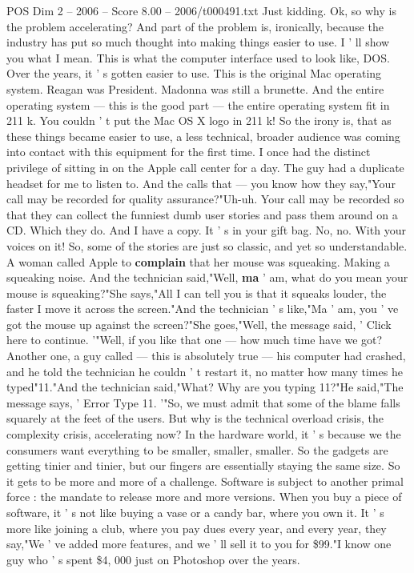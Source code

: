\begin{textsample}{POS Dim 2 – 2006 – Score 8.00 – 2006/t000491.txt}
Just kidding.
Ok, so why is the problem accelerating?
And part of the problem is, ironically, because the industry has put so much thought into making things easier to use.
I ' ll show you what I mean.
This is what the computer interface used to look like, DOS.
Over the years, it ' s gotten easier to use.
This is the original Mac operating system.
Reagan was President.
Madonna was still a brunette.
And the entire operating system — this is the good part — the entire operating system fit in 211 k.
You couldn ' t put the Mac OS X logo in 211 k!
So the irony is, that as these things became easier to use, a less technical, broader audience was coming into contact with this equipment for the first time.
I once had the distinct privilege of sitting in on the Apple call center for a day.
The guy had a duplicate headset for me to listen to.
And the calls that — you know how they say,"Your call may be recorded for quality assurance?"Uh-uh.
Your call may be recorded so that they can collect the funniest dumb user stories and pass them around on a CD.
Which they do.
And I have a copy.
It ' s in your gift bag.
No, no.
With your voices on it!
So, some of the stories are just so classic, and yet so understandable.
A woman called Apple to \textbf{complain} that her mouse was squeaking.
Making a squeaking noise.
And the technician said,"Well, \textbf{ma} ' am, what do you mean your mouse is squeaking?"She says,"All I can tell you is that it squeaks louder, the faster I move it across the screen."And the technician ' s like,"Ma ' am, you ' ve got the mouse up against the screen?"She goes,"Well, the message said, ' Click here to continue. '"Well, if you like that one — how much time have we got?
Another one, a guy called — this is absolutely true — his computer had crashed, and he told the technician he couldn ' t restart it, no matter how many times he typed"11."And the technician said,"What?
Why are you typing 11?"He said,"The message says, ' Error Type 11. '"So, we must admit that some of the blame falls squarely at the feet of the users.
But why is the technical overload crisis, the complexity crisis, accelerating now?
In the hardware world, it ' s because we the consumers want everything to be smaller, smaller, smaller.
So the gadgets are getting tinier and tinier, but our fingers are essentially staying the same size.
So it gets to be more and more of a challenge.
Software is subject to another primal force : the mandate to release more and more versions.
When you buy a piece of software, it ' s not like buying a vase or a candy bar, where you own it.
It ' s more like joining a club, where you pay dues every year, and every year, they say,"We ' ve added more features, and we ' ll sell it to you for \$99."I know one guy who ' s spent \$4, 000 just on Photoshop over the years.

\end{textsample}
